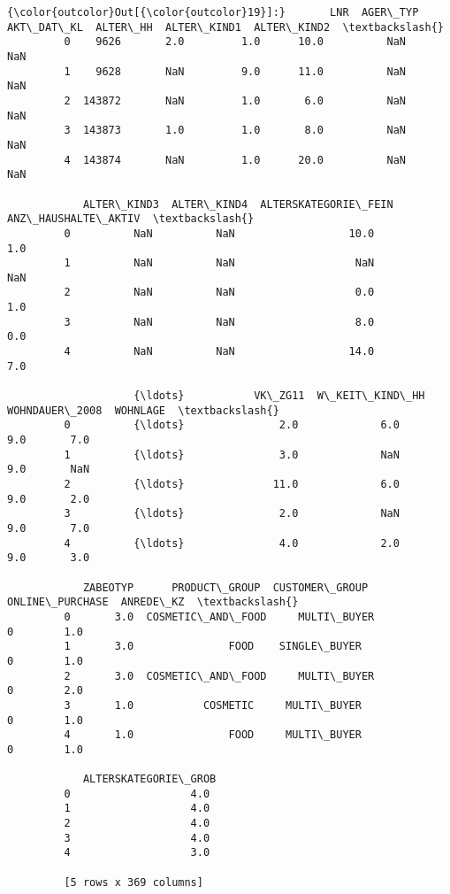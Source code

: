 \documentclass[11pt]{article}
\begin{document}
\begin{Verbatim}[commandchars=\\\{\}]
{\color{outcolor}Out[{\color{outcolor}19}]:}       LNR  AGER\_TYP  AKT\_DAT\_KL  ALTER\_HH  ALTER\_KIND1  ALTER\_KIND2  \textbackslash{}
         0    9626       2.0         1.0      10.0          NaN          NaN   
         1    9628       NaN         9.0      11.0          NaN          NaN   
         2  143872       NaN         1.0       6.0          NaN          NaN   
         3  143873       1.0         1.0       8.0          NaN          NaN   
         4  143874       NaN         1.0      20.0          NaN          NaN   
         
            ALTER\_KIND3  ALTER\_KIND4  ALTERSKATEGORIE\_FEIN  ANZ\_HAUSHALTE\_AKTIV  \textbackslash{}
         0          NaN          NaN                  10.0                  1.0   
         1          NaN          NaN                   NaN                  NaN   
         2          NaN          NaN                   0.0                  1.0   
         3          NaN          NaN                   8.0                  0.0   
         4          NaN          NaN                  14.0                  7.0   
         
                    {\ldots}           VK\_ZG11  W\_KEIT\_KIND\_HH  WOHNDAUER\_2008  WOHNLAGE  \textbackslash{}
         0          {\ldots}               2.0             6.0             9.0       7.0   
         1          {\ldots}               3.0             NaN             9.0       NaN   
         2          {\ldots}              11.0             6.0             9.0       2.0   
         3          {\ldots}               2.0             NaN             9.0       7.0   
         4          {\ldots}               4.0             2.0             9.0       3.0   
         
            ZABEOTYP      PRODUCT\_GROUP  CUSTOMER\_GROUP ONLINE\_PURCHASE  ANREDE\_KZ  \textbackslash{}
         0       3.0  COSMETIC\_AND\_FOOD     MULTI\_BUYER               0        1.0   
         1       3.0               FOOD    SINGLE\_BUYER               0        1.0   
         2       3.0  COSMETIC\_AND\_FOOD     MULTI\_BUYER               0        2.0   
         3       1.0           COSMETIC     MULTI\_BUYER               0        1.0   
         4       1.0               FOOD     MULTI\_BUYER               0        1.0   
         
            ALTERSKATEGORIE\_GROB  
         0                   4.0  
         1                   4.0  
         2                   4.0  
         3                   4.0  
         4                   3.0  
         
         [5 rows x 369 columns]
\end{Verbatim}
            
\end{document}
